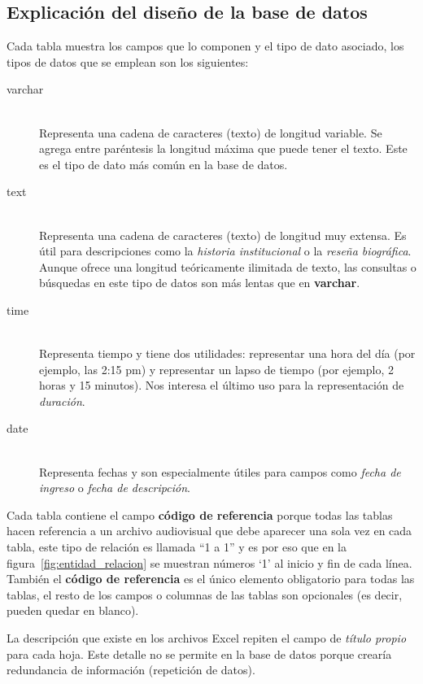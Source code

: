 \documentclass[10pt,letterpaper]{article}
\begin{document}
\subsection{Explicación del diseño de la base de datos}
Cada tabla muestra los campos que lo componen y el tipo de dato asociado, los tipos de datos que se emplean son los siguientes:
\begin{description}
	\item[varchar] \hfill \\
		Representa una cadena de caracteres (texto) de longitud variable. Se agrega entre paréntesis la longitud máxima que puede tener el texto. Este es el tipo de dato más común en la base de datos.

	\item[text] \hfill \\
		Representa una cadena de caracteres (texto) de longitud muy extensa. Es útil para descripciones como la \textit{historia institucional} o la \textit{reseña biográfica}. Aunque ofrece una longitud teóricamente ilimitada de texto, las consultas o búsquedas en este tipo de datos son más lentas que en \textbf{varchar}.
	\item[time] \hfill \\
		Representa tiempo y tiene dos utilidades: representar una hora del día (por ejemplo, las 2:15 pm) y representar un lapso de tiempo (por ejemplo, 2 horas y 15 minutos). Nos interesa el último uso para la representación de \textit{duración}.
	\item[date] \hfill \\
		Representa fechas y son especialmente útiles para campos como \textit{fecha de ingreso} o \textit{fecha de descripción}.
\end{description}

Cada tabla contiene el campo \textbf{código de referencia} porque todas las tablas hacen referencia a un archivo audiovisual que debe aparecer una sola vez en cada tabla, este tipo de relación es llamada ``1 a 1'' y es por eso que en la figura~\ref{fig:entidad_relacion} se muestran números `1' al inicio y fin de cada línea.
También el \textbf{código de referencia} es el único elemento obligatorio para todas las tablas, el resto de los campos o columnas de las tablas son opcionales (es decir, pueden quedar en blanco).

La descripción que existe en los archivos Excel repiten el campo de \textit{título propio} para cada hoja. Este detalle no se permite en la base de datos porque crearía redundancia de información (repetición de datos).
\end{document}
